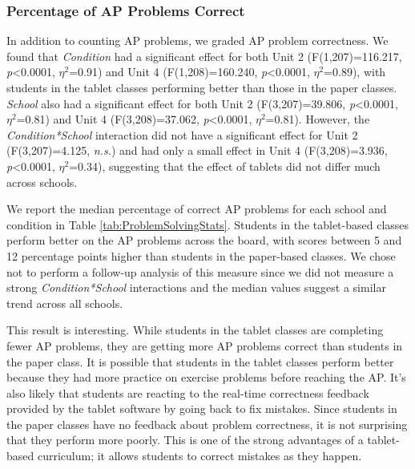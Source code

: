 \documentclass{sigchi}
\begin{document}
\subsubsection{Percentage of AP Problems Correct}
In addition to counting AP problems, we graded AP problem correctness. We found that \emph{Condition} had a significant effect for both Unit 2 (F(1,207)=116.217, \emph{p}\textless0.0001, $\eta^2$=0.91) and Unit 4 (F(1,208)=160.240, \emph{p}\textless0.0001, $\eta^2$=0.89), with students in the tablet classes performing better than those in the paper classes. \emph{School} also had a significant effect for both Unit 2 (F(3,207)=39.806, \emph{p}\textless0.0001, $\eta^2$=0.81) and Unit 4 (F(3,208)=37.062, \emph{p}\textless0.0001, $\eta^2$=0.81). However, the \emph{Condition*School} interaction did not have a significant effect for Unit 2 (F(3,207)=4.125, \emph{n.s.}) and had only a small effect in Unit 4 (F(3,208)=3.936, \emph{p}\textless0.0001, $\eta^2$=0.34), suggesting that the effect of tablets did not differ much across schools.

We report the median percentage of correct AP problems for each school and condition in Table \ref{tab:ProblemSolvingStats}. Students in the tablet-based classes perform better on the AP problems across the board, with scores between 5 and 12 percentage points higher than students in the paper-based classes. We chose not to perform a follow-up analysis of this measure since we did not measure a strong \emph{Condition*School} interactions and the median values suggest a similar trend across all schools.

This result is interesting. While students in the tablet classes are completing fewer AP problems, they are getting more AP problems correct than students in the paper class. It is possible that students in the tablet classes perform better because they had more practice on exercise problems before reaching the AP. It's also likely that students are reacting to the real-time correctness feedback provided by the tablet software by going back to fix mistakes. Since students in the paper classes have no feedback about problem correctness, it is not surprising that they perform more poorly. This is one of the strong advantages of a tablet-based curriculum; it allows students to correct mistakes as they happen.
\end{document}
